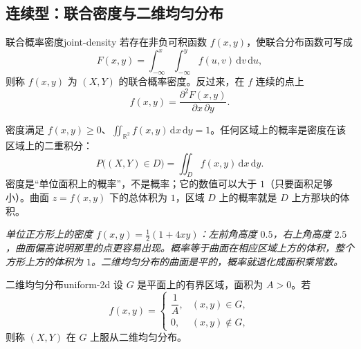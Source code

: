 \subsection{连续型：联合密度与二维均匀分布}

\begin{mydef}{联合概率密度}{joint-density}
若存在非负可积函数 $f(x,y)$，使联合分布函数可写成
\[
F(x,y)=\int_{-\infty}^{x}\!\!\int_{-\infty}^{y}f(u,v)\,\mathrm dv\,\mathrm du ,
\]
则称 $f(x,y)$ 为 $(X,Y)$ 的联合概率密度。反过来，在 $f$ 连续的点上
\[
f(x,y)=\frac{\partial^2 F(x,y)}{\partial x\,\partial y}.
\]
\end{mydef}

密度满足 $f(x,y)\ge 0$、$\displaystyle\iint_{\mathbb R^2} f(x,y)\,\mathrm dx\,\mathrm dy=1$。任何区域上的概率是密度在该区域上的二重积分：
\[
P\bigl((X,Y)\in D\bigr)=\iint_D f(x,y)\,\mathrm dx\,\mathrm dy .
\]
密度是“单位面积上的概率”，不是概率；它的数值可以大于 $1$（只要面积足够小）。曲面 $z=f(x,y)$ 下的总体积为 $1$，区域 $D$ 上的概率就是 $D$ 上方那块的体积。

\begin{center}
\par\vspace{2pt}
{\footnotesize\itshape 单位正方形上的密度 $f(x,y)=\frac12(1+4xy)$：左前角高度 $0.5$，右上角高度 $2.5$，曲面偏高说明那里的点更容易出现。概率等于曲面在相应区域上方的体积，整个方形上方的体积为 $1$。二维均匀分布的曲面是平的，概率就退化成面积乘常数。}
\end{center}

\begin{mydef}{二维均匀分布}{uniform-2d}
设 $G$ 是平面上的有界区域，面积为 $A>0$。若
\[
f(x,y)=\begin{cases}\dfrac{1}{A}, & (x,y)\in G,\\[4pt] 0, & (x,y)\notin G,\end{cases}
\]
则称 $(X,Y)$ 在 $G$ 上服从二维均匀分布。
\end{mydef}

